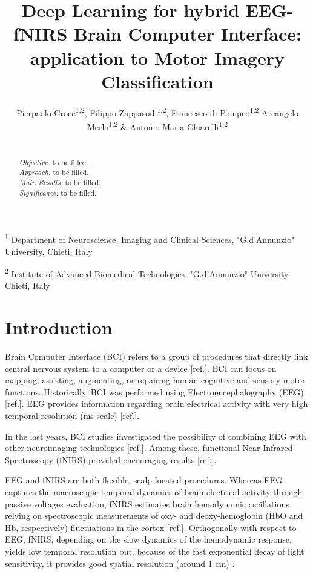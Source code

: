 \documentclass[12pt ]{iopart}
\begin{document}
\title[DNN for EEG-fNIRS BCI]{Deep Learning for  hybrid EEG-fNIRS Brain Computer Interface: application to Motor Imagery Classification}

\author{Pierpaolo Croce\textsuperscript{1,2}, Filippo Zappasodi\textsuperscript{1,2}, Francesco di Pompeo\textsuperscript{1,2} Arcangelo Merla\textsuperscript{1,2} \& Antonio Maria Chiarelli\textsuperscript{1,2}}

\vspace{10pt}
\begin{indented}
\item[] \textsuperscript{1} Department of Neuroscience, Imaging and Clinical Sciences, "G.d’Annunzio" University, Chieti, Italy
\item[] \textsuperscript{2} Institute of Advanced Biomedical Technologies, "G.d’Annunzio" University, Chieti, Italy
\end{indented}

\begin{abstract}
	\\
	\textit{Objective.} to be filled. \\
	\textit{Approach.} to be filled.\\
	\textit{Main Results.} to be filled. \\
	\textit{Significance.} to be filled.
\end{abstract}


\section{Introduction}

Brain Computer Interface (BCI) refers to a group of procedures that directly link  central nervous system to a computer or a device [ref.]. BCI can focus on mapping, assisting, augmenting, or repairing human cognitive and sensory-motor functions. 
Historically, BCI was performed using Electroencephalography (EEG) [ref.]. EEG  provides information regarding brain electrical activity with very high temporal resolution (ms scale) [ref.]. 

In the last years, BCI studies investigated the possibility of combining EEG with other neuroimaging technologies [ref.]. Among these, functional Near Infrared Spectroscopy (fNIRS) provided encouraging results [ref.]. 

EEG and fNIRS are both flexible, scalp located procedures. Whereas EEG captures the macroscopic temporal dynamics of brain electrical activity through passive voltages evaluation, fNIRS estimates brain hemodynamic oscillations  relying on spectroscopic measurements of oxy- and deoxy-hemoglobin (HbO and Hb, respectively) fluctuations in the cortex [ref.]. Orthogonally with respect to EEG, fNIRS, depending on the slow dynamics of the hemodynamic response, yields low temporal resolution but, because of the fast exponential decay of light sensitivity, it provides good spatial resolution (around 1 cm) \parencite{chiarelli2016combining}. 
\end{document}

